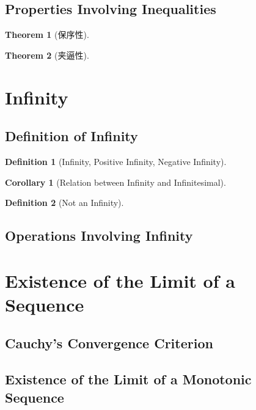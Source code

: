 \documentclass[onecolumn]{ctexart}
\newtheorem{definition}{Definition}
\newtheorem{theorem}{Theorem}
\newtheorem{corollary}{Corollary}
\begin{document}
\subsection{Properties Involving Inequalities}

\begin{theorem}[保序性]
  
\end{theorem}

\begin{theorem}[夹逼性]
  
\end{theorem}

\section{Infinity}

\subsection{Definition of Infinity}

\begin{definition}[Infinity, Positive Infinity, Negative Infinity]
  
\end{definition}

\begin{corollary}[Relation between Infinity and Infinitesimal]
  
\end{corollary}

\begin{definition}[Not an Infinity]
  
\end{definition}

\subsection{Operations Involving Infinity}

\section{Existence of the Limit of a Sequence}

\subsection{Cauchy's Convergence Criterion}

\subsection{Existence of the Limit of a Monotonic Sequence}
\end{document}
